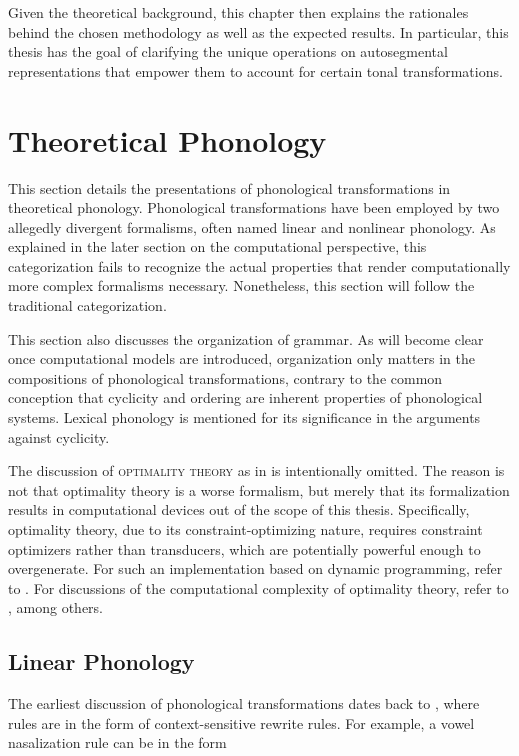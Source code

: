 \documentclass[12pt, a4paper]{report}
\newcommand{\textterm}[1]{\textsc{#1}\index{#1}}
\begin{document}
Given the theoretical background, this chapter then explains the
rationales behind the chosen methodology as well as the expected
results.  In particular, this thesis has the goal of clarifying the
unique operations on autosegmental representations that empower them
to account for certain tonal transformations.

\section{Theoretical Phonology}
This section details the presentations of phonological transformations
in theoretical phonology.  Phonological transformations have been
employed by two allegedly divergent formalisms, often named linear and
nonlinear phonology.  As explained in the later section on the
computational perspective, this categorization fails to recognize the
actual properties that render computationally more complex formalisms
necessary.  Nonetheless, this section will follow the traditional
categorization.

This section also discusses the organization of grammar.  As will
become clear once computational models are introduced, organization
only matters in the compositions of phonological transformations,
contrary to the common conception that cyclicity and ordering are
inherent properties of phonological systems.  Lexical phonology is
mentioned for its significance in the arguments against cyclicity.

The discussion of \textterm{optimality theory} as in
\textcite{ps93otcigg} is intentionally omitted.  The reason is not
that optimality theory is a worse formalism, but merely that its
formalization results in computational devices out of the scope of
this thesis.  Specifically, optimality theory, due to its
constraint-optimizing nature, requires constraint optimizers rather
than transducers, which are potentially powerful enough to
overgenerate.  For such an implementation based on dynamic
programming, refer to \textcite{t95cot}.  For discussions of the
computational complexity of optimality theory, refer to
\textcite{e97egpot, i06sptotci, hkr09ecot}, among others.

\subsection{Linear Phonology}
The earliest discussion of phonological transformations dates back to
\textcite{ch68spe}, where rules are in the form of context-sensitive
rewrite rules.  For example, a vowel nasalization rule can be in the
form
\end{document}
